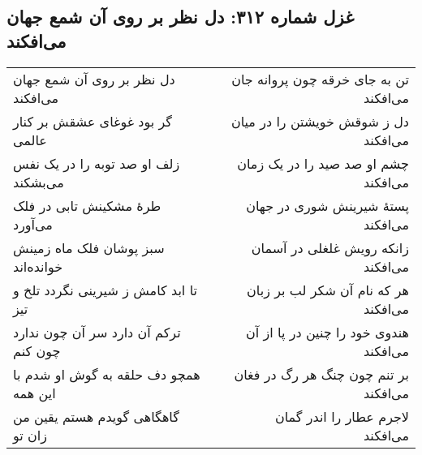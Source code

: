 \begin{center}
\section*{غزل شماره ۳۱۲: دل نظر بر روی آن شمع جهان می‌افکند}
\label{sec:312}
\begin{longtable}{l p{0.5cm} r}
دل نظر بر روی آن شمع جهان می‌افکند
&&
تن به جای خرقه چون پروانه جان می‌افکند
\\
گر بود غوغای عشقش بر کنار عالمی
&&
دل ز شوقش خویشتن را در میان می‌افکند
\\
زلف او صد توبه را در یک نفس می‌بشکند
&&
چشم او صد صید را در یک زمان می‌افکند
\\
طرهٔ مشکینش تابی در فلک می‌آورد
&&
پستهٔ شیرینش شوری در جهان می‌افکند
\\
سبز پوشان فلک ماه زمینش خوانده‌اند
&&
زانکه رویش غلغلی در آسمان می‌افکند
\\
تا ابد کامش ز شیرینی نگردد تلخ و تیز
&&
هر که نام آن شکر لب بر زبان می‌افکند
\\
ترکم آن دارد سر آن چون ندارد چون کنم
&&
هندوی خود را چنین در پا از آن می‌افکند
\\
همچو دف حلقه به گوش او شدم با این همه
&&
بر تنم چون چنگ هر رگ در فغان می‌افکند
\\
گاهگاهی گویدم هستم یقین من زان تو
&&
لاجرم عطار را اندر گمان می‌افکند
\\
\end{longtable}
\end{center}
